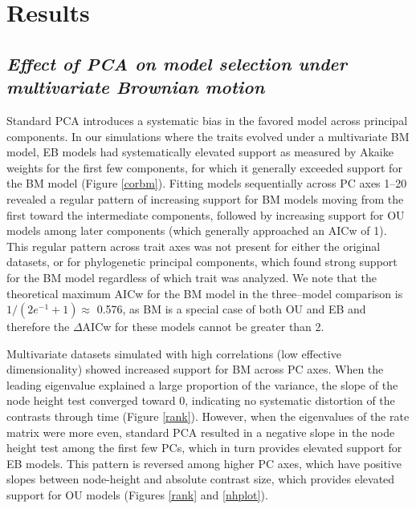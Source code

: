 \documentclass[a4paper,11pt]{article}
\begin{document}
\section{Results}
\subsection{\emph{Effect of PCA on model selection under multivariate Brownian motion}}
Standard PCA introduces a systematic bias in the favored model across principal components. In our simulations where the traits evolved under a multivariate BM model, EB models had systematically elevated support as measured by Akaike weights for the first few components, for which it generally exceeded support for the BM model (Figure \ref{corbm}). Fitting models sequentially across PC axes 1--20 revealed a regular pattern of increasing support for BM models moving from the first toward the intermediate components, followed by increasing support for OU models among later components (which generally approached an AICw of 1). This regular pattern across trait axes was not present for either the original datasets, or for phylogenetic principal components, which found strong support for the BM model regardless of which trait was analyzed. We note that the theoretical maximum AICw for the BM model in the three--model comparison is $1/(2e^{-1} + 1) \approx$ 0.576, as BM is a special case of both OU and EB and therefore the $\Delta$AICw for these models cannot be greater than 2.   

Multivariate datasets simulated with high correlations (low effective dimensionality) showed increased support for BM across PC axes. When the leading eigenvalue explained a large proportion of the variance, the slope of the node height test converged toward 0, indicating no systematic distortion of the contrasts through time (Figure \ref{rank}). However, when the eigenvalues of the rate matrix were more even, standard PCA resulted in a negative slope in the node height test among the first few PCs, which in turn provides elevated support for EB models. This pattern is reversed among higher PC axes, which have positive slopes between node-height and absolute contrast size, which provides elevated support for OU models (Figures \ref{rank} and \ref{nhplot}). 
\end{document}
